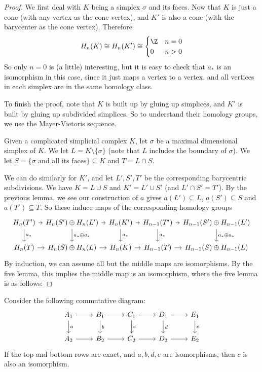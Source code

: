 \documentclass[a4paper]{article}
\begin{document}
\begin{proof}
  We first deal with $K$ being a simplex $\sigma$ and its faces. Now that $K$ is just a cone (with any vertex as the cone vertex), and $K'$ is also a cone (with the barycenter as the cone vertex). Therefore
  \[
    H_n(K) \cong H_{n}(K') \cong
    \begin{cases}
      \Z & n = 0\\
      0 & n > 0
    \end{cases}
  \]
  So only $n = 0$ is (a little) interesting, but it is easy to check that $a_*$ is an isomorphism in this case, since it just maps a vertex to a vertex, and all vertices in each simplex are in the same homology class.

  To finish the proof, note that $K$ is built up by gluing up simplices, and $K'$ is built by gluing up subdivided simplices. So to understand their homology groups, we use the Mayer-Vietoris sequence.

  Given a complicated simplicial complex $K$, let $\sigma$ be a maximal dimensional simplex of $K$. We let $L = K \setminus \{\sigma\}$ (note that $L$ includes the boundary of $\sigma$). We let $S = \{\sigma\text{ and all its faces}\} \subseteq K$ and $T = L \cap S$.

  We can do similarly for $K'$, and let $L', S', T'$ be the corresponding barycentric subdivisions. We have $K = L \cup S$ and $K' = L' \cup S'$ (and $L' \cap S' = T'$). By the previous lemma, we see our construction of $a$ gives $a(L') \subseteq L$, $a(S') \subseteq S$ and $a(T') \subseteq T$. So these induce maps of the corresponding homology groups
  \[
    \begin{tikzcd}[column sep=tiny]
      H_n(T') \ar[r] \ar[d, "a_*"] & H_n(S') \oplus H_n(L') \ar[r] \ar[d, "a_* \oplus a_*"] & H_n(K') \ar[r] \ar[d, "a_*"] & H_{n - 1}(T') \ar[r] \ar[d, "a_*"] & H_{n - 1}(S') \oplus H_{n - 1} (L') \ar[d, "a_* \oplus a_*"]\\
      H_n(T) \ar[r] & H_n(S) \oplus H_n(L) \ar[r] & H_n(K) \ar[r] & H_{n - 1}(T) \ar[r] & H_{n - 1}(S) \oplus H_{n - 1} (L)
    \end{tikzcd}
  \]
  By induction, we can assume all but the middle maps are isomorphisms. By the five lemma, this implies the middle map is an isomorphism, where the five lemma is as follows:
\end{proof}

\begin{lemma}
  Consider the following commutative diagram:
  \[
    \begin{tikzcd}
      A_1 \ar[r] \ar[d, "a"] & B_1 \ar[r] \ar[d, "b"] & C_1 \ar[r] \ar[d, "c"] & D_1 \ar[r] \ar[d, "d"] & E_1 \ar[d, "e"]\\
      A_2 \ar[r] & B_2 \ar[r] & C_2 \ar[r] & D_2 \ar[r] & E_2
    \end{tikzcd}
  \]
  If the top and bottom rows are exact, and $a, b, d, e$ are isomorphisms, then $c$ is also an isomorphism.
\end{lemma}
\end{document}
